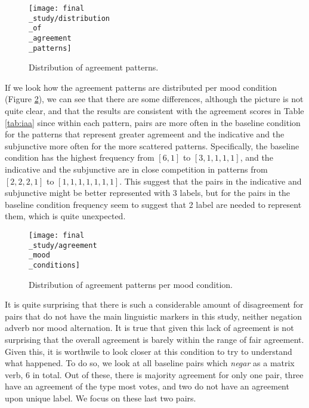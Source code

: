 \begin{figure}
\parbox{15cm}{\texttt{[image: final\\\_study/distribution\\\_of\\\_agreement\\\_patterns]}
\caption{Distribution of agreement patterns.}\label{fig:pat}}
\qquad
\end{figure}

If we look how the agreement patterns are distributed per mood condition (Figure \ref{fig:moodpat}), we can see that there are some differences, although the picture is not quite clear, and that the results are consistent with the agreement scores in Table \ref{tab:iaa} since within each pattern, pairs are more often in the baseline condition for the patterns that represent greater agremeent and the indicative and the subjunctive more often for the more scattered patterns. Specifically, the baseline condition has the highest frequency from $[6,1]$ to $[3,1,1,1,1]$, and the indicative and the subjunctive are in close competition in patterns from $[2,2,2,1]$ to $[1,1,1,1,1,1,1]$. This suggest that the pairs in the indicative and subjunctive might be better represented with 3 labels, but for the pairs in the baseline condition frequency seem to suggest that 2 label are needed to represent them, which is quite unexpected.\\

\begin{figure}
\parbox{15cm}{\texttt{[image: final\\\_study/agreement\\\_mood\\\_conditions]}
\caption{Distribution of agreement patterns per mood condition.}\label{fig:moodpat}}
\qquad
\end{figure}

It is quite surprising that there is such a considerable amount of disagreement for pairs that do not have the main linguistic markers in this study, neither negation adverb nor mood alternation. It is true that given this lack of agreement is not surprising that the overall agreement is barely within the range of fair agreement. Given this, it is worthwile to look closer at this condition to try to understand what happened. To do so, we look at all baseline pairs which \textit{negar} as a matrix verb, $6$ in total. Out of these, there is majority agreement for only one pair, three have an agreement of the type most votes, and two do not have an agreement upon unique label. We focus on these last two pairs.\\

